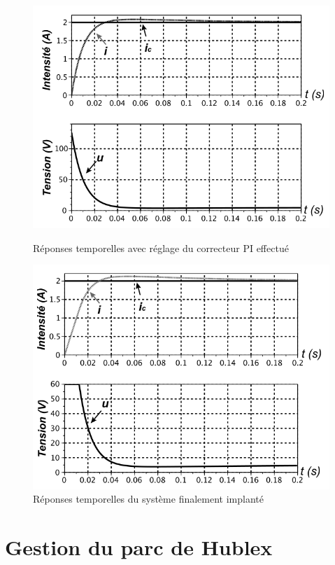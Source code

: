 \begin{figure}[ht!]
 \begin{minipage}{0.45\linewidth}
 \includegraphics[width=\linewidth]{img/fig13}
 \caption{\label{fig13}Réponses temporelles avec réglage du correcteur PI effectué}
 \end{minipage}\hfill
 \begin{minipage}{0.45\linewidth}
 \includegraphics[width=\linewidth]{img/fig14}
 \caption{\label{fig14}Réponses temporelles du système finalement implanté}
 \end{minipage}
\end{figure}

\newpage

\section{Gestion du parc de Hublex}

